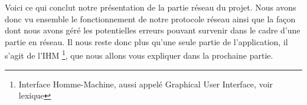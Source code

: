 	Voici ce qui conclut notre présentation de la partie réseau du projet. Nous avons donc vu ensemble le fonctionnement de notre protocole réseau ainsi que la façon dont nous avons géré les potentielles erreurs pouvant survenir dans le cadre d'une partie en réseau. Il nous reste donc plus qu'une seule partie de l'application, il s'agit de l'IHM \footnote{Interface Homme-Machine, aussi appelé Graphical User Interface, voir lexique}, que nous allons vous expliquer dans la prochaine partie.

